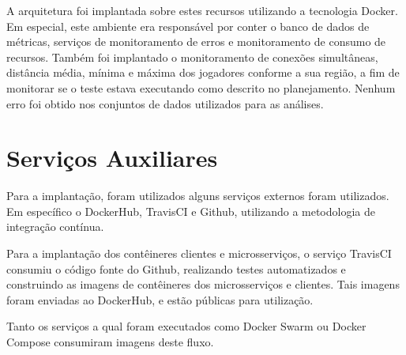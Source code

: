 A arquitetura foi implantada sobre estes recursos utilizando a tecnologia Docker. Em especial, este ambiente era responsável por conter o banco de dados de métricas, serviços de monitoramento de erros e monitoramento de consumo de recursos.
%
Também foi implantado o monitoramento de conexões simultâneas, distância média, mínima e máxima dos jogadores conforme a sua região, a fim de monitorar se o teste estava executando como descrito no planejamento.
%
Nenhum erro foi obtido nos conjuntos de dados utilizados para as análises.

\section{Serviços Auxiliares}
\label{sec:servicos_aux}

Para a implantação, foram utilizados alguns serviços externos foram utilizados.
%
Em específico o DockerHub, TravisCI e Github, utilizando a metodologia de integração contínua.

Para a implantação dos contêineres clientes e microsserviços, o serviço TravisCI consumiu o código fonte do Github, realizando testes automatizados e construindo as imagens de contêineres dos microsserviços e clientes.
%
Tais imagens foram enviadas ao DockerHub, e estão públicas para utilização.

Tanto os serviços a qual foram executados como Docker Swarm ou Docker Compose consumiram imagens deste fluxo.
